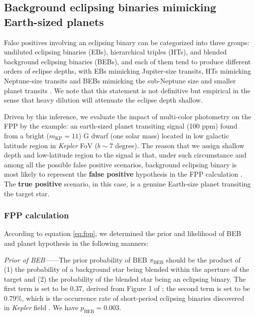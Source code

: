 \documentclass{aastex63}
\begin{document}
\subsection{Background eclipsing binaries mimicking Earth-sized planets}
\label{sec:beb_fpp}

False positives involving an eclipsing binary can be categorized into three groups: undiluted eclipsing binaries (EBs), hierarchical triples (HTs), and blended background eclipsing binaries (BEBs), and each of them tend to produce different orders of eclipse depths, with EBs mimicking Jupiter-size transits, HTs mimicking Neptune-size transits and BEBs mimicking the sub-Neptune size and smaller planet transits \citep{Morton2012,Morton2016,Fressin2013}. We note that this statement is not definitive but empirical in the sense that heavy dilution will attenuate the eclipse depth shallow.

Driven by this inference, we evaluate the impact of multi-color photometry on the FPP by the example: an earth-sized planet transiting signal (100 ppm) found from a bright ($m_\mathrm{KP}=11$) G dwarf (one solar mass) located in low galactic latitude region in \emph{Kepler} FoV ($b\sim 7$ degree). The reason that we assign shallow depth and low-latitude region to the signal is that, under such circumstance and among all the possible false positive scenarios, background eclipsing binary is most likely to represent the \textbf{false positive} hypothesis in the FPP calculation \citep{Fressin2013,Batalha2010}. The \textbf{true positive} scenario, in this case, is a genuine Earth-size planet transiting the target star.

\subsubsection{FPP calculation}
 \label{sec:beb_lhood}
 
 According to equation \ref{eq:fpp}, we determined the prior and likelihood of BEB and planet hypothesis in the following manners:

 \emph{Prior of BEB}——The prior probability of BEB $\pi_\mathrm{BEB}$ should be the product of (1) the probability of a background star being blended within the aperture of the target and (2) the probability of the blended star being an eclipsing binary. The first term is set to be 0.37, derived from Figure 1 of \cite{Morton2011}; the second term is set to be 0.79\%, which is the occurrence rate of short-period eclipsing binaries discovered in \emph{Kepler} field \citep{Slawson2011}. We have $p_\mathrm{BEB}=0.003$.
 
\end{document}
